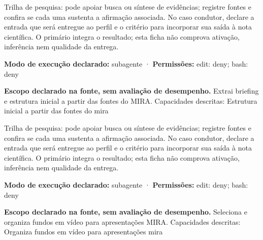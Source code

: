 \begin{funcao}
Trilha de pesquisa: pode apoiar busca ou síntese de evidências; registre fontes e confira se cada uma sustenta a afirmação associada. No caso condutor, declare a entrada que será entregue ao perfil e o critério para incorporar sua saída à nota científica. O primário integra o resultado; esta ficha não comprova ativação, inferência nem qualidade da entrega.
\end{funcao}

\begin{arquitetura}
\textbf{Modo de execução declarado:} subagente · \textbf{Permissões:} edit: deny; bash: deny
\end{arquitetura}


\begin{descricao}
\textbf{Escopo declarado na fonte, sem avaliação de desempenho.}
Extrai briefing e estrutura inicial a partir das fontes do MIRA. Capacidades descritas: Estrutura inicial a partir das fontes do mira
\end{descricao}

\begin{funcao}
Trilha de pesquisa: pode apoiar busca ou síntese de evidências; registre fontes e confira se cada uma sustenta a afirmação associada. No caso condutor, declare a entrada que será entregue ao perfil e o critério para incorporar sua saída à nota científica. O primário integra o resultado; esta ficha não comprova ativação, inferência nem qualidade da entrega.
\end{funcao}

\begin{arquitetura}
\textbf{Modo de execução declarado:} subagente · \textbf{Permissões:} edit: deny; bash: deny
\end{arquitetura}


\begin{descricao}
\textbf{Escopo declarado na fonte, sem avaliação de desempenho.}
Seleciona e organiza fundos em vídeo para apresentações MIRA. Capacidades descritas: Organiza fundos em vídeo para apresentações mira
\end{descricao}

